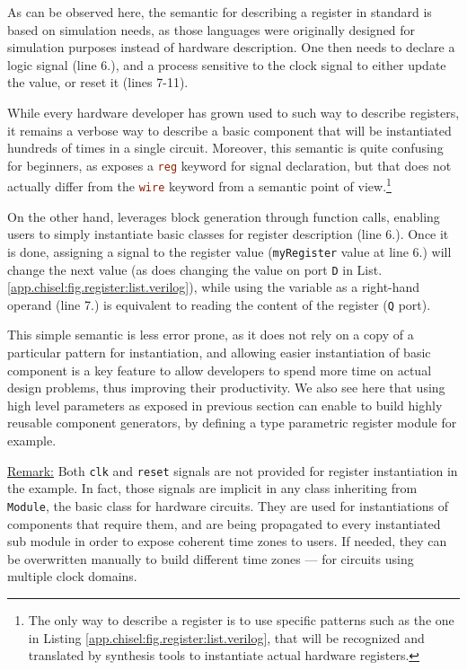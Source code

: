             As can be observed here, the semantic for describing a register in standard  is based on simulation needs, as those languages were originally designed for simulation purposes instead of hardware description.
            One then needs to declare a logic signal (line 6.), and a process sensitive to the clock signal to either update the value, or reset it (lines 7-11).

            While every hardware developer has grown used to such way to describe registers, it remains a verbose way to describe a basic component that will be instantiated hundreds of times in a single circuit.
            Moreover, this semantic is quite confusing for beginners, as \verilog{} exposes a \lstinline[language=Verilog]{reg} keyword for signal declaration, but that does not actually differ from the \lstinline[language=Verilog]{wire} keyword from a semantic point of view.\footnote{The only way to describe a register is to use specific patterns such as the one in Listing \ref{app.chisel:fig.register:list.verilog}, that will be recognized and translated by synthesis tools to instantiate actual hardware registers.}

            On the other hand, \chisel{} leverages block generation through function calls, enabling users to simply instantiate basic classes for register description (line 6.).
            Once it is done, assigning a signal to the register value (\ie \lstinline{myRegister} value at line 6.) will change the next value (as does changing the value on port \lstinline{D} in List. \ref{app.chisel:fig.register:list.verilog}), while using the variable as a right-hand operand (line 7.) is equivalent to reading the content of the register (\lstinline{Q} port).

            This simple semantic is less error prone, as it does not rely on a copy of a particular pattern for instantiation, and allowing easier instantiation of basic component is a key feature to allow developers to spend more time on actual design problems, thus improving their productivity.
            We also see here that using high level parameters as exposed in previous section can enable to build highly reusable component generators, by defining a type parametric register module for example.

            \underline{Remark:} Both \lstinline{clk} and \lstinline{reset} signals are not provided for register instantiation in the \chisel{} example.
            In fact, those signals are implicit in any class inheriting from \lstinline{Module}, the basic class for hardware circuits.
            They are used for instantiations of components that require them, and are being propagated to every instantiated sub module in order to expose coherent time zones to users.
            If needed, they can be overwritten manually to build different time zones --- \eg for circuits using multiple clock domains.

